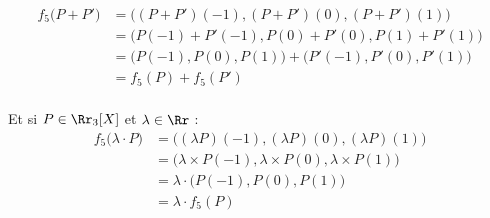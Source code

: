 {{\begin{align*}
f_5\big(P+P'\big) 
  & = \big( (P+P')(-1), (P+P')(0), (P+P')(1) \big) \\
  & = \big( P(-1)+P'(-1), P(0)+P'(0), P(1)+P'(1) \big) \\
  & = \big( P(-1), P(0), P(1) \big)  + \big( P'(-1), P'(0), P'(1) \big) \\
  & = f_5(P)+f_5(P')  \\
\end{align*}

Et si $P\in \Rr_3[X]$ et $\lambda \in \Rr$ :
\begin{align*}
f_5\big( \lambda \cdot P\big) 
  & =  \big( (\lambda P)(-1), (\lambda P)(0), (\lambda P)(1) \big) \\
  & = \big( \lambda \times P(-1), \lambda \times P(0), \lambda \times P(1) \big) \\
  & = \lambda \cdot \big( P(-1), P(0), P(1) \big) \\
  & = \lambda \cdot f_5(P) \\
\end{align*}
}
}
